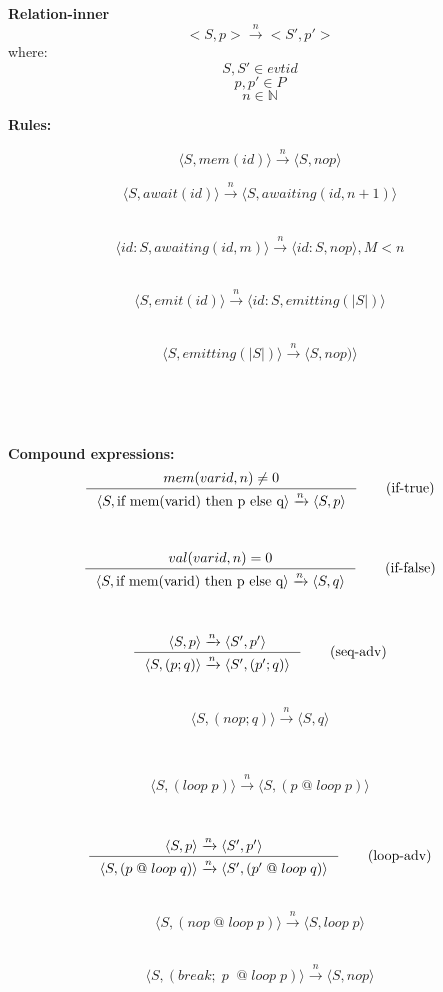 \documentclass[9pt]{article}
\newcommand{\inner}{\xrightarrow{n}}
\newcommand{\tuple}[1]{\langle#1\rangle}
\begin{document}
\textbf{Relation-inner}
\[
  {<S,p> \inner <S',p'>}
\]
where:
\[
  S,S' \in evtid   \tag{sequence of event identifiers}
\]
\[
  p,p' \in P       \tag{programs following the abstract syntax}
\]
\[
  n \in \mathbb{N} \tag{unique identifier for the reaction chain}
\]

\textbf{Rules:}

\[
  \tuple{S, mem(id)} \inner \tuple{S, nop}
  \tag{mem}
\]

\[
  \tuple{S, await(id)} \inner \tuple{S, awaiting(id, n+1)} 
  \tag{await}
\]

~
\[
  \tuple{id:S, awaiting(id, m)} \inner \tuple{id:S, nop}, M < n 
  \tag{awake}
\]

~
\[
  \tuple{S, emit(id)} \inner \tuple{id:S, emitting(|S|)} 
  \tag{emit}
\]

~
\[
  \tuple{S, emitting(|S|)} \inner \tuple{S, nop)} 
  \tag{pop}
\]

~

~

\textbf{Compound expressions:}
\[
  \inference{mem(varid,n)\ne0}
            {\tuple{ S, \textrm{if mem(varid) then p else q}} \inner \tuple{ S, p}}
            \tag{if-true}
\]

~
\[
  \inference{val(varid,n)=0}
            {\tuple{ S, \textrm{if mem(varid) then p else q}} \inner \tuple{ S, q}}
            \tag{if-false}
\]

~
\[
  \inference{\tuple{ S, p} \inner \tuple{ S', p'}}
            {\tuple{ S, (p ; q)} \inner \tuple{ S', (p' ; q)}}
            \tag{seq-adv}
\]

~
\[
  \tuple{ S, (nop ; q)} \inner \tuple{ S, q}
    \tag{seq-nop}
\]

~

\[
  \tuple{ S, (loop \;p)} \inner \tuple{ S, (p\; @\; loop \;p)} 
    \tag{loop-expd}
\]

~
\[
  \inference{\tuple{ S, p} \inner \tuple{ S', p'}}
            {\tuple{ S, (p \; @ \; loop\; q)} \inner \tuple{ S', (p' \; @ \; loop \; q)}}
            \tag{loop-adv}
\]

~
\[
  \tuple{ S, (nop\; @ \; loop \; p)} \inner \tuple{ S, loop \; p}
    \tag{loop-nop}
\]

~
\[
  \tuple{ S, (break ; \; p \; \; @ \; loop \; p) } \inner \tuple{ S, nop}
    \tag{loop-break}
\]
\end{document}
